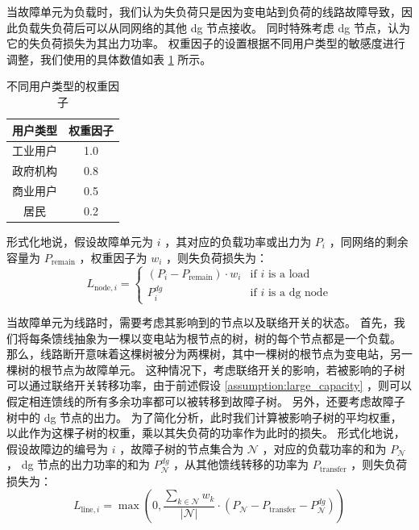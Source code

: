 \documentclass{article}
\begin{document}
当故障单元为负载时，我们认为失负荷只是因为变电站到负荷的线路故障导致，因此负载失负荷后可以从同网络的其他 dg 节点接收。
同时特殊考虑 dg 节点，认为它的失负荷损失为其出力功率。
权重因子的设置根据不同用户类型的敏感度进行调整，我们使用的具体数值如表 \ref{tab:weight_factor} 所示。
\begin{table}[h]
  \centering
  \begin{tabular}{|c|c|}
    \hline
    用户类型 & 权重因子 \\
    \hline
    工业用户 & 1.0 \\
    政府机构 & 0.8 \\
    商业用户 & 0.5 \\
    居民 & 0.2 \\
    \hline
  \end{tabular}
  \caption{不同用户类型的权重因子}
  \label{tab:weight_factor}
\end{table}
形式化地说，假设故障单元为 $i$ ，其对应的负载功率或出力为 $P_i$ ，同网络的剩余容量为 $P_{\text{remain}}$ ，权重因子为 $w_i$ ，则失负荷损失为：
\begin{equation}\label{eq:loss_node}
  L_{\text{node},i} =
  \begin{cases}
    (P_i - P_{\text{remain}}) \cdot w_i & \text{if } i \text{ is a load} \\
    P_i^{dg} & \text{if } i \text{ is a dg node}
  \end{cases}
\end{equation}

当故障单元为线路时，需要考虑其影响到的节点以及联络开关的状态。
首先，我们将每条馈线抽象为一棵以变电站为根节点的树，树的每个节点都是一个负载。
那么，线路断开意味着这棵树被分为两棵树，其中一棵树的根节点为变电站，另一棵树的根节点为故障单元。
这种情况下，考虑联络开关的影响，若被影响的子树可以通过联络开关转移功率，由于前述假设 \ref{assumption:large_capacity} ，则可以假定相连馈线的所有多余功率都可以被转移到故障子树。
另外，还要考虑故障子树中的 dg 节点的出力。
为了简化分析，此时我们计算被影响子树的平均权重，以此作为这棵子树的权重，乘以其失负荷的功率作为此时的损失。
形式化地说，假设故障边的编号为 $i$ ，故障子树的节点集合为 $\mathcal{N}$ ，对应的负载功率的和为 $P_{\mathcal{N}}$ ，
dg 节点的出力功率的和为 $P_{\mathcal{N}}^{dg}$ ，从其他馈线转移的功率为 $P_{\text{transfer}}$ ，则失负荷损失为：
\begin{equation}\label{eq:loss_line}
  L_{\text{line},i} = \max\left(
    0,
    \frac{\sum_{k\in\mathcal{N}}w_k}{|\mathcal{N}|} \cdot
    (P_{\mathcal{N}} - P_{\text{transfer}} - P_{\mathcal{N}}^{dg})
  \right)
\end{equation}
\end{document}
